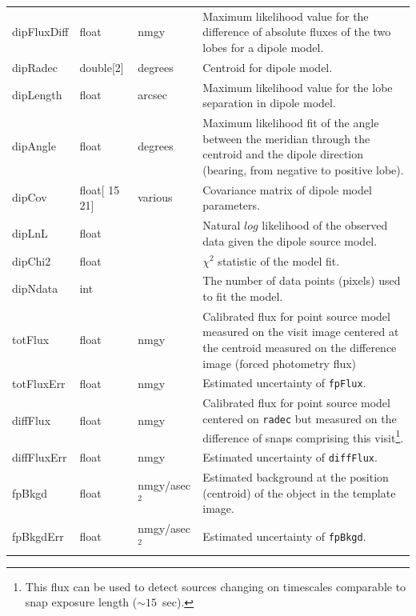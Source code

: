 \documentclass[12pt]{article}
\newcommand{\B}[1]{{\color{blue} #1}}
\newcommand{\R}[1]{{\color{red} #1}}
\begin{document}
\begin{center}
\begin{longtable}{p{3cm}p{2cm}p{2cm}p{5cm}}
dipFluxDiff & float & nmgy & Maximum likelihood value for the difference of absolute fluxes of the two lobes for a dipole model.
\\

dipRadec & double[2] & degrees & Centroid for dipole model. \\

dipLength & float & arcsec & Maximum likelihood value for the lobe separation in dipole model. \\

dipAngle & float & degrees & Maximum likelihood fit of the angle between the meridian through the centroid and the dipole direction (bearing, from negative to positive lobe). \\

dipCov & float[\R{15}\B{21}] & various & Covariance matrix of dipole model parameters. \\

dipLnL & float & ~ & Natural $log$ likelihood of the observed data given the dipole source model. \\

dipChi2 & float & ~ & $\chi^2$ statistic of the model fit. \\

dipNdata & int & ~ & The number of data points (pixels) used to fit the model. \\

totFlux & float & nmgy & Calibrated flux for point source model measured on the visit image centered at the centroid measured on the difference image (forced photometry flux) \\

totFluxErr & float & nmgy & Estimated uncertainty of \texttt{fpFlux}. \\

diffFlux & float & nmgy & Calibrated flux for point source model centered on \texttt{radec} but measured on the difference of snaps comprising this visit\footnote{This flux can be used to detect sources changing on timescales comparable to snap exposure length ($\sim 15$~sec).}. \\

diffFluxErr & float & nmgy & Estimated uncertainty of \texttt{diffFlux}. \\

fpBkgd & float & nmgy/asec$^{2}$ & Estimated background at the position (centroid) of the object in
the template image. \\

fpBkgdErr & float & nmgy/asec$^{2}$ & Estimated uncertainty of \texttt{fpBkgd}. \\


\end{longtable}
\end{center}
\end{document}
